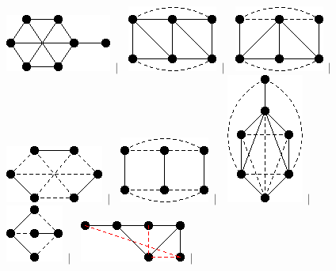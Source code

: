 \documentclass[11pt,paper=b5,footinclude,headinclude]{scrbook} %
\newtheorem{ex}{Vaja\hypertarget{sol:\theex}}[chapter]
\begin{document}
\begin{ex}
\begin{figure}
\includegraphics[scale=0.5]{smallGraphs/g_X99.png}$\,\mid\,$\
\includegraphics[scale=0.5]{smallGraphs/g_XC2.png}$\,\mid\,$\
\includegraphics[scale=0.5]{smallGraphs/g_XC3.png}$\,\mid\,$\
\includegraphics[scale=0.5]{smallGraphs/g_XC5.png}$\,\mid\,$\
\includegraphics[scale=0.5]{smallGraphs/g_XC6.png}$\,\mid\,$\
\includegraphics[scale=0.5]{smallGraphs/g_XC8.png}$\,\mid\,$\
\includegraphics[scale=0.5]{smallGraphs/g_XC9.png}$\,\mid\,$\
\includegraphics[scale=0.5]{smallGraphs/g_XZ11.png}$\,\mid\,$\

\end{figure}
\end{ex}
\end{document}
